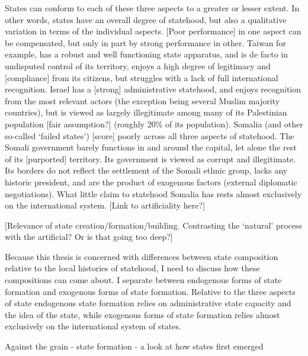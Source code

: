 States can conform to each of these three aspects to a greater or lesser extent.
In other words, states have an overall degree of statehood, but also a
qualitative variation in terms of the individual aspects. [Poor performance] in
one aspect can be compensated, but only in part by strong performance in other.
Taiwan for example, has a robust and well functioning state apparatus, and is de
facto in undisputed control of its territory, enjoys a high degree of legitimacy
and [compliance] from its citizens, but struggles with a lack of full
international recognition. Israel has a [strong] administrative statehood, and
enjoys recognition from the most relevant actors (the exception being several
Muslim majority countries), but is viewed as largely illegitimate among many of
its Palestinian population [fair assumption?] (roughly 20\% of its population).
Somalia (and other so-called `failed states') [score] poorly across all three
aspects of statehood. The Somali government barely functions in and around the
capital, let alone the rest of its [purported] territory. Its government is
viewed as corrupt and illegitimate. Its borders do not reflect the settlement of
the Somali ethnic group, lacks any historic president, and are the product of
exogenous factors (external diplomatic negotiations). What little claim to
statehood Somalia has rests almost exclusively on the international system.
[Link to artificiality here?]

[Relevance of state creation/formation/building. Contrasting the `natural'
process with the artificial? Or is that going too deep?] 

Because this thesis is concerned with differences between state composition
relative to the local histories of statehood, I need to discuss how these
compositions can come about. I separate between endogenous forms of state
formation and exogenous forms of state formation. Relative to the three aspects
of state endogenous state formation relies on administrative state capacity and
the idea of the state, while exogenous forms of state formation relies almost
exclusively on the international system of states.

\citet{scott2017against} Against the grain - state formation - a look at how
states first emerged

